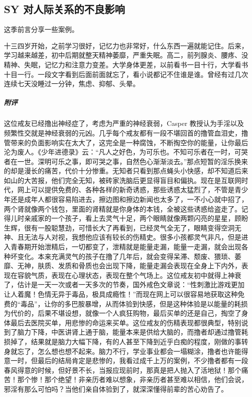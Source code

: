 \subsection{SY 对人际关系的不良影响}

这季前言分享一些案例。

\begin{case}
    十三四岁开始，之前学习很好，记忆力也非常好，什么东西一遍就能记住。后来，学习越来越差，初中后期就整天精神萎靡，严重失眠。高二，前列腺炎、腰疼、没精神、失眠，记忆力和注意力变差。大学身体更差，以前看书一目十行，大学看书十目一行。一段文字看到后面前面就忘了，看小说都记不住谁是谁。曾经有过几次连续七天没睡过一分钟，焦虑、抑郁、头晕。
    \subparagraph{附评} 这位戒友已经撸出神经症了，考虑为严重的神经衰弱，Casper 教授认为手淫以及频繁性交就是神经衰弱的元凶。几乎每个戒友都有一段不堪回首的撸管血泪史，撸管带来的负面影响实在太大了，这完全是一种腐蚀，不断掏空你的能量，让你最后沦为废人。《少年进德录》云：“凡人之好色，为可乐也。不知可乐者在一时，可哭者在一世。深明可乐之事，即可哭之事，自然色心渐渐淡去。”那点短暂的淫乐换来的却是漫长的痛苦，代价十分惨重。无知者只看到那点蝇头小快感，却不知道后来如山的大苦报，他们完全无知，被砖家洗脑后更显得盲目和偏执。现在是互联网时代，网上可以提供免费的、各种各样的新奇诱惑，那些诱惑太猛烈了，不管是青少年还是成年人都很容易陷进去，擦边图和擦边新闻也太多了，一不小心就中招了，两个肾就像两个钱包，里面的肾精就是你身体的本钱，全被这些诱惑给盗走了。记得儿时亲戚家的一个孩子，看上去灵气十足，两个眼睛就像两颗闪亮的星星，顾盼生辉，很有一股聪慧劲，可惜长大了再看到，已经灵气全无了，眼睛变得空洞无神、且无法与人对视，我想他应该有较长的伤精史。很多小孩都灵气非凡，但是进入青春期开始泄精后，一切都变了，泄精就是能量走漏，能量一走漏，就会出现各种坏变化。本来充满灵气的孩子在撸了几年后，就会变得呆滞、颓废、猥琐、萎靡、无神，肤质、发质和骨质也会出现下降，能量走漏会表现在全身上下内外，表现在容貌气质，表现在心理状态，表现在整个气场上。这位戒友初中就得上神衰了，估计是一天一次或者一天多次的节奏，国外戒色文章说：“性刺激比游戏更加让人着魔！色情无异于毒品，极具成瘾性！”而现在网上可以很容易地获取这种免费的“毒品”，让你的多巴胺暴增，从而体验到快感，但是这种体验是以能量的耗损为代价的，后果不堪设想，就像一个人疯狂购物，最后买单的还是自己，掏空了身体最后去医院买单，用悲惨的命运来买单。这位戒友的伤精表现都很典型，特别说到了脑力下降，中医讲肾上通于脑，能量本来是供给大脑的，而撸者却通过撸管耗损掉了，结果就是脑力大幅下降，有的人甚至下降到近乎白痴的程度，刚做的事转身就忘了，怎么想也想不起来。脑力不行，学业事业都会一塌糊涂，撸者也许能得意一时，但最后的结局肯定是悲惨的，我看过成千上万的案例，不少撸者都有一段春风得意的时候，但好景不长，当报应现前时，那真是把人抛入了活地狱！那个痛苦！那个惨！那个绝望！非亲历者难以想象，非亲历者甚至难以相信，他们会说，邪淫有那么可怕吗？当他们亲自体验到了，就深深懂得前辈的苦心劝告了。
\end{case}

